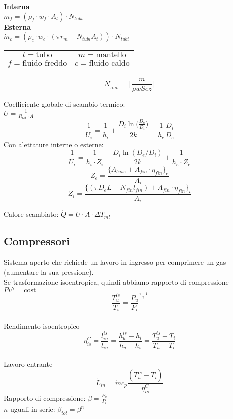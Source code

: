 \documentclass[landscape,a4paper]{article}
\begin{document}
\begin{multicols}{4}
\textbf{Interna}\\
\(\dot{m}_f = (\rho_f\cdot w_f \cdot A_t)\cdot N_{tubi}\) \\
\textbf{Esterna}\\
\(\dot{m}_c = (\rho_c\cdot w_c \cdot (\pi r_{m}-N_{tubi}A_t))\cdot N_{tubi}\) \\
\begin{tabular}{c c}
	$t = \text{tubo}$ & $m = \text{mantello}$ \\ $f=\text{fluido freddo}$ & $c = \text{fluido caldo}$
\end{tabular}

\[ N_{_{TUBI}} = \Bigg \lceil \frac {\dot m}{\rho \overline w Sez} \Bigg \rceil \]


Coefficiente globale di scambio termico: \\
\(U = \frac{1}{R_{tot}\cdot A}\)
\[ \frac {1}{U_{i}} = \frac {1}{h_{i}} + \frac {D_{i} \ln \Big( \frac {D_{e}}{D_{i}} \Big) } {2k} + \frac {1}{h_{e}} \frac {D_{i}}{D_{e}}  \]
Con alettature interne o esterne: 
\[ \frac {1}{U_{i}} = \frac {1}{h_{i}\cdot Z_i} + \frac {D_{i} \ln ( D_e/D_i)} {2k} + \frac {1}{h_{e}\cdot Z_e}\]
\[Z_e = \frac{\{A_{base} + A_{fin} \cdot \eta_{fin}\}_e}{A_i}\]
\[Z_i = \frac{\{(\pi D_e L - N_{fin}l_{fin}) + A_{fin} \cdot \eta_{fin}\}_i}{A_i}\]


Calore scambiato: \(\dot{Q} = U \cdot A\cdot \Delta T_{ml}\)







\subsection*{Compressori}
Sistema aperto che richiede un lavoro in ingresso per comprimere un gas (aumentare la sua pressione). \\
Se trasformazione isoentropica, quindi abbiamo rapporto di compressione
\(Pv^\gamma = \text{cost}\) \\
\[\frac{T_u^{is}}{T_i}=\frac{P_u}{P_i}^{\frac{\gamma -1}{\gamma}} \] \\
Rendimento isoentropico \\
\[ \eta_{is}^C = \frac{l_{in}^{is}}{l_{in}} = \frac{h_{u}^{is} - h_i}{h_u - h_i} =  \frac{T_{u}^{is} - T_i}{T_u - T_i}\] \\
Lavoro entrante \\
\[ \dot L_{in} = \dot m c_p \frac{(T_u^{is} - T_i)}{\eta_{is}^C} \]
Rapporto di compressione: \(\beta = \frac{P_u}{P_i}\) \\
$n$ uguali in serie: \(\beta_{tot} = \beta^n\)



\end{multicols}
\end{document}
